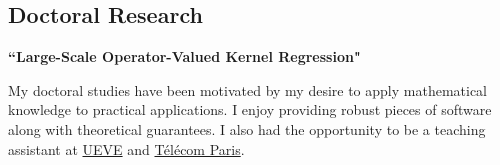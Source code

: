 \documentclass[10pt]{article} %
\begin{document}
\begin{paracol}{2}
\section{Doctoral Research}
%
{\raggedright\textbf{``Large-Scale Operator-Valued Kernel
                       Regression"} \\}
My doctoral studies  have been motivated by my desire to apply mathematical
knowledge to practical applications. I enjoy providing robust pieces of
software along with theoretical guarantees. I also had the opportunity to be a
teaching assistant at \href{https://www.univ-evry.fr/accueil.html}{UEVE} and
\href{https://www.telecom-paris.fr/}{T\'el\'ecom Paris}.
%
%
%
%
%
%
%
%
%
%
%
%

%
%

\end{paracol}
\end{document}
